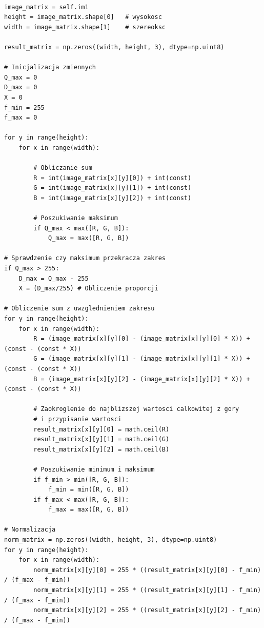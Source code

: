 \documentclass[final,a4paper,openany,12pt]{mwbk}
\begin{document}
\begin{lstlisting}[caption=Sumowanie obrazu barwowego ze stałą]

image_matrix = self.im1
height = image_matrix.shape[0]   # wysokosc
width = image_matrix.shape[1]    # szereoksc

result_matrix = np.zeros((width, height, 3), dtype=np.uint8)

# Inicjalizacja zmiennych
Q_max = 0
D_max = 0
X = 0
f_min = 255
f_max = 0

for y in range(height):
    for x in range(width):  

        # Obliczanie sum
        R = int(image_matrix[x][y][0]) + int(const)
        G = int(image_matrix[x][y][1]) + int(const)
        B = int(image_matrix[x][y][2]) + int(const)

        # Poszukiwanie maksimum               
        if Q_max < max([R, G, B]):
            Q_max = max([R, G, B])

# Sprawdzenie czy maksimum przekracza zakres
if Q_max > 255:
    D_max = Q_max - 255
    X = (D_max/255) # Obliczenie proporcji

# Obliczenie sum z uwzglednieniem zakresu
for y in range(height):
    for x in range(width): 
        R = (image_matrix[x][y][0] - (image_matrix[x][y][0] * X)) + (const - (const * X))
        G = (image_matrix[x][y][1] - (image_matrix[x][y][1] * X)) + (const - (const * X))
        B = (image_matrix[x][y][2] - (image_matrix[x][y][2] * X)) + (const - (const * X))

        # Zaokroglenie do najblizszej wartosci calkowitej z gory
        # i przypisanie wartosci
        result_matrix[x][y][0] = math.ceil(R)
        result_matrix[x][y][1] = math.ceil(G)
        result_matrix[x][y][2] = math.ceil(B)

        # Poszukiwanie minimum i maksimum                
        if f_min > min([R, G, B]):
            f_min = min([R, G, B])
        if f_max < max([R, G, B]):
            f_max = max([R, G, B])

# Normalizacja
norm_matrix = np.zeros((width, height, 3), dtype=np.uint8)
for y in range(height):
    for x in range(width):
        norm_matrix[x][y][0] = 255 * ((result_matrix[x][y][0] - f_min) / (f_max - f_min))
        norm_matrix[x][y][1] = 255 * ((result_matrix[x][y][1] - f_min) / (f_max - f_min))
        norm_matrix[x][y][2] = 255 * ((result_matrix[x][y][2] - f_min) / (f_max - f_min))

\end{lstlisting}
\end{document}
